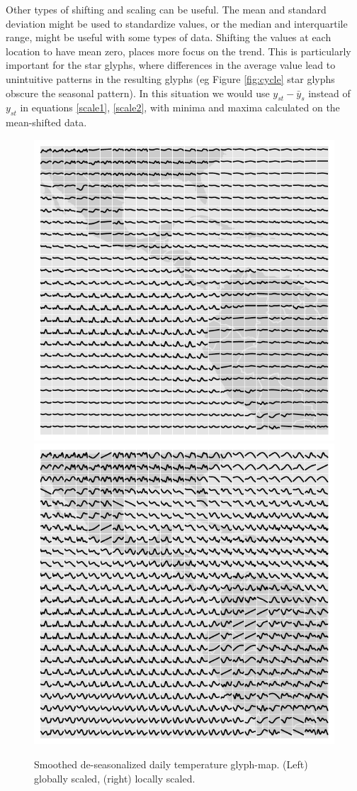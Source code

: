 \documentclass[oneside]{article}
\begin{document}
Other types of shifting and scaling can be useful. The mean and standard deviation might be used to standardize values, or the median and interquartile range, might be useful with some types of data. Shifting the values at each location to have mean zero, places more focus on the trend. This is particularly important for the star glyphs, where differences in the average value lead to unintuitive patterns in the resulting glyphs (eg Figure \ref{fig:cycle} star glyphs obscure the seasonal pattern).  In this situation we would use $y_{st}-\bar{y}_s$ instead of $y_{st}$ in equations \ref{scale1}, \ref{scale2}, with minima and maxima calculated on the mean-shifted data.




\begin{figure}[htbp]
  \centering
  \includegraphics[width=0.5\linewidth]{month-rescale-max}%
  \includegraphics[width=0.5\linewidth]{month-rescale01}
  \caption{Smoothed de-seasonalized daily temperature glyph-map. (Left) %
globally scaled, (right) locally scaled.}
  \label{fig:scaling}
\end{figure}
\end{document}
